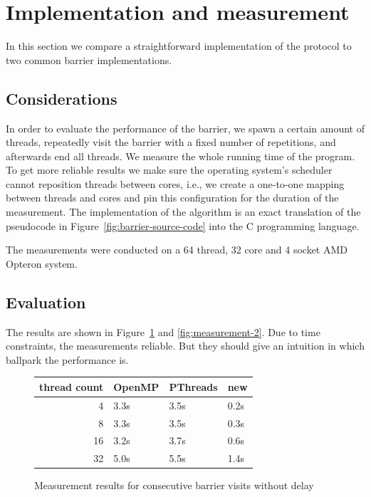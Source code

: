 \documentclass[a4paper, 10pt]{article}
\begin{document}
\clearpage

\section{Implementation and measurement}
In this section we compare a straightforward implementation of the protocol to two common barrier implementations.
\subsection{Considerations}
In order to evaluate the performance of the barrier, we spawn a certain amount of threads, repeatedly visit the barrier with a fixed number of repetitions, and afterwards end all threads. We measure the whole running time of the program. To get more reliable results we make sure the operating system's scheduler cannot reposition threads between cores, i.e., we create a one-to-one mapping between threads and cores and pin this configuration for the duration of the measurement. The implementation of the algorithm is an exact translation of the pseudocode in Figure~\ref{fig:barrier-source-code} into the C programming language.

The measurements were conducted on a 64 thread, 32 core and 4 socket AMD Opteron system.
\subsection{Evaluation}
The results are shown in Figure~\ref{fig:measurement-1} and \ref{fig:measurement-2}. Due to time constraints, the measurements reliable. But they should give an intuition in which ballpark the performance is.
\begin{figure}[htbp]
	\centering
	\begin{tabular}{r | l l l }
		thread count & OpenMP  & PThreads  & new \\
		\hline
		 4           & 3.3s    & 3.5s      & 0.2s \\
		 8           & 3.3s    & 3.5s      & 0.3s \\
		16           & 3.2s    & 3.7s      & 0.6s \\
		32           & 5.0s    & 5.5s      & 1.4s \\
	\end{tabular}
	\caption{Measurement results for consecutive barrier visits without delay}
	\label{fig:measurement-1}
\end{figure}
\end{document}
